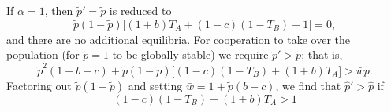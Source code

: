 \documentclass[12pt]{extarticle}
\begin{document}
{If $\alpha=1$, then $\tilde{p}'= \tilde{p}$ is reduced to
\begin{equation}
\tilde{p}(1-\tilde{p})\big[(1+b)T_A + (1-c)(1-T_B)-1\big] = 0,
\end{equation}
and there are no additional equilibria.
For cooperation to take over the population (for $\tilde{p}=1$ to be globally stable) we require $\tilde{p}'>\tilde{p}$; that is,
\begin{equation}
  \tilde{p}^2 (1+b-c) + \tilde{p}(1-\tilde{p}) \big[(1-c) (1 - T_B) + (1+b)T_A\big] 
  > \bar{w}\tilde{p} .
\end{equation}
Factoring out $\tilde{p}(1-\tilde{p})$ and setting $\bar{w} = 1 + \tilde{p}(b-c)$, we find that $\hat{p}'>\hat{p}$ if
\begin{equation} \label{eq:vert_hori_alpha1_condition_proof}
  (1-c) (1 - T_B) + (1+b)T_A
  > 1
\end{equation}
\\

}
\end{document}
